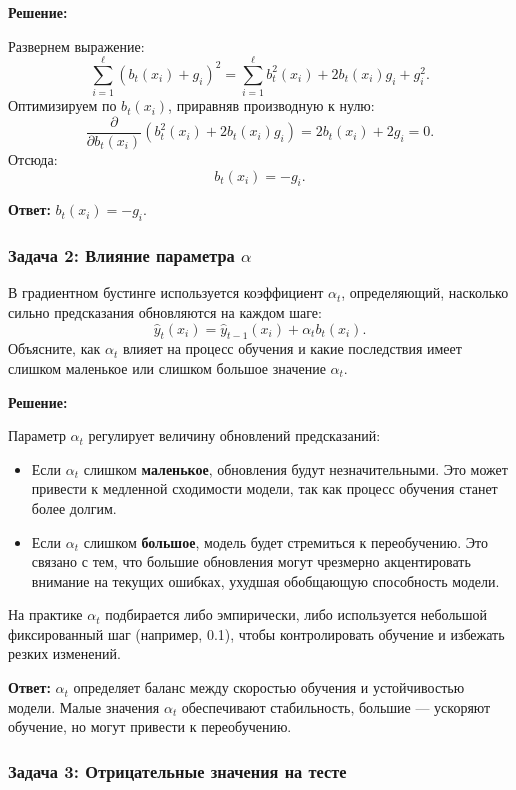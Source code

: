 \textbf{Решение:}

Развернем выражение:
\[
\sum_{i=1}^\ell (b_t(x_i) + g_i)^2 = \sum_{i=1}^\ell b_t^2(x_i) + 2b_t(x_i)g_i + g_i^2.
\]
Оптимизируем по $b_t(x_i)$, приравняв производную к нулю:
\[
\frac{\partial}{\partial b_t(x_i)} \left(b_t^2(x_i) + 2b_t(x_i)g_i \right) = 2b_t(x_i) + 2g_i = 0.
\]
Отсюда:
\[
b_t(x_i) = -g_i.
\]

\textbf{Ответ:} $b_t(x_i) = -g_i$.

\subsubsection{Задача 2: Влияние параметра $\alpha$}

В градиентном бустинге используется коэффициент $\alpha_t$, определяющий, насколько сильно предсказания обновляются на каждом шаге:
\[
\hat{y}_t(x_i) = \hat{y}_{t-1}(x_i) + \alpha_t b_t(x_i).
\]
Объясните, как $\alpha_t$ влияет на процесс обучения и какие последствия имеет слишком маленькое или слишком большое значение $\alpha_t$.

\textbf{Решение:}

Параметр $\alpha_t$ регулирует величину обновлений предсказаний:
\begin{itemize}
    \item Если $\alpha_t$ слишком \textbf{маленькое}, обновления будут незначительными. Это может привести к медленной сходимости модели, так как процесс обучения станет более долгим.
    \item Если $\alpha_t$ слишком \textbf{большое}, модель будет стремиться к переобучению. Это связано с тем, что большие обновления могут чрезмерно акцентировать внимание на текущих ошибках, ухудшая обобщающую способность модели.
\end{itemize}

На практике $\alpha_t$ подбирается либо эмпирически, либо используется небольшой фиксированный шаг (например, 0.1), чтобы контролировать обучение и избежать резких изменений.

\textbf{Ответ:} $\alpha_t$ определяет баланс между скоростью обучения и устойчивостью модели. Малые значения $\alpha_t$ обеспечивают стабильность, большие — ускоряют обучение, но могут привести к переобучению.

\subsubsection{Задача 3: Отрицательные значения на тесте}

